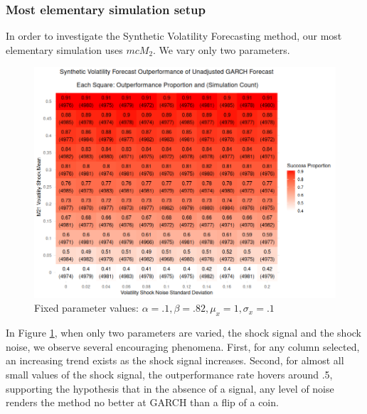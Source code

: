 \documentclass[11pt]{article}
\theoremstyle{definition}
\begin{document}
\subsubsection{Most elementary simulation setup}

In order to investigate the Synthetic Volatility Forecasting method, our most elementary simulation uses $mc{M}_2$.  We vary only two parameters. 

\begin{figure}[ht!]
\begin{center}
  \includegraphics[scale=.45]{simulation_plots/standard_simulation_alpha_.1_beta_.82.png}
  \caption{Fixed parameter values: $\alpha = .1, \beta = .82, \mu_{x} = 1, \sigma_{x} = .1$}
  \label{fig:heavy_beta}
\end{center}
\end{figure}

In Figure \ref{fig:heavy_beta}, when only two parameters are varied, the shock signal and the shock noise, we observe several encouraging phenomena.  First, for any column selected, an increasing trend exists as the shock signal increases.  Second, for almost all small values of the shock signal, the outperformance rate hovers around .5, supporting the hypothesis that in the absence of a signal, any level of noise renders the method no better at GARCH than a flip of a coin.
\end{document}
